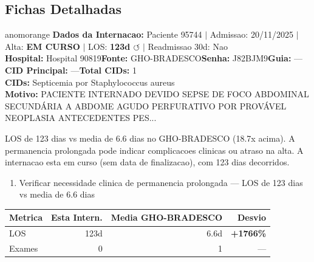 \documentclass[a4paper,10pt]{article}
\begin{document}
\subsection{Fichas Detalhadas}
\begin{anomalycard}[Internacao 115153 | GHO-BRADESCO | ALTO (z=4.34)]{anomorange}
\textbf{Dados da Internacao:} Paciente 95744 $\mid$ Admissao: 20/11/2025 $\mid$ Alta: \textcolor{anomorange}{\textbf{EM CURSO}} $\mid$ LOS: \textbf{123d \textcolor{anomorange}{$\circlearrowleft$}} $\mid$ Readmissao 30d: Nao\\
\textbf{Hospital:} Hospital 90819\quad\textbf{Fonte:} GHO-BRADESCO\quad\textbf{Senha:} J82BJM9\quad\textbf{Guia:} ---\\
\textbf{CID Principal:} {\small ---}\quad\textbf{Total CIDs:} 1\\

\textbf{CIDs:} {\scriptsize Septicemia por Staphylococcus aureus}\\

\textbf{Motivo:} {\scriptsize PACIENTE INTERNADO DEVIDO SEPSE DE FOCO ABDOMINAL SECUNDÁRIA A ABDOME AGUDO PERFURATIVO POR PROVÁVEL NEOPLASIA  ANTECEDENTES PES...}\\

\vspace{2pt}\begin{tcolorbox}[colback=severityred!20,colframe=anomorange,title={\textbf{Interpretacao de Negocio}},fonttitle=\bfseries\small,left=4pt,right=4pt,top=3pt,bottom=3pt]
{\small LOS de 123 dias vs media de 6.6 dias no GHO-BRADESCO (18.7x acima). A permanencia prolongada pode indicar complicacoes clinicas ou atraso na alta. A internacao esta em curso (sem data de finalizacao), com 123 dias decorridos.}
\end{tcolorbox}
\begin{tcolorbox}[colback=severityyellow!30,colframe=anomorange,title={\textbf{Recomendacoes Especificas}},fonttitle=\bfseries\small,left=4pt,right=4pt,top=3pt,bottom=3pt]
\begin{enumerate}[nosep,leftmargin=16pt]
\item {\small Verificar necessidade clinica de permanencia prolongada --- LOS de 123 dias vs media de 6.6 dias}
\end{enumerate}
\end{tcolorbox}
\begin{center}\begin{tabular}{l r r r}\toprule\textbf{Metrica} & \textbf{Esta Intern.} & \textbf{Media GHO-BRADESCO} & \textbf{Desvio} \\\midrule
LOS & 123d & 6.6d & \textcolor{anomred}{\textbf{+1766\%}} \\
Exames & 0 & 1 & --- \\
\bottomrule\end{tabular}\end{center}


\end{anomalycard}
\end{document}
